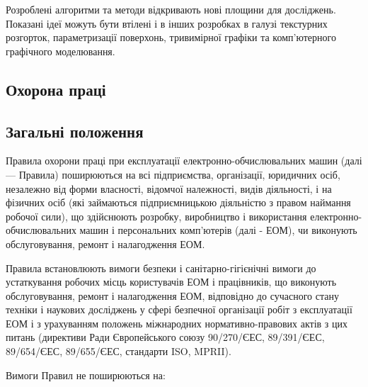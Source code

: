 \documentclass[simple,a4paper,14pt,ukrainian,utf8]{eskdtext}
\begin{document}
    Розроблені алгоритми та методи відкривають нові площини для досліджень. Показані ідеї можуть бути втілені і в інших розробках в галузі текстурних розгорток, параметризації поверхонь, тривимірної графіки та комп’ютерного графічного моделювання.

    \newpage
    \begin{appendices}

                \section{Охорона праці}

            \subsection{Загальні положення}

                Правила охорони праці при експлуатації електронно-обчислювальних машин (далі --- Правила) поширюються на всі підприємства, організації, юридичних осіб, незалежно від форми власності, відомчої належності, видів діяльності, і на фізичних осіб (які займаються підприємницькою діяльністю з правом наймання робочої сили), що здійснюють розробку, виробництво і використання електронно-обчислювальних машин і персональних комп'ютерів (далі - ЕОМ), чи виконують обслуговування, ремонт і налагодження ЕОМ.

                Правила встановлюють вимоги безпеки і санітарно-гігієнічні вимоги до устаткування робочих місць користувачів ЕОМ і працівників, що виконують обслуговування, ремонт і налагодження ЕОМ, відповідно до сучасного стану техніки і наукових досліджень у сфері безпечної організації робіт з експлуатації ЕОМ і з урахуванням положень міжнародних нормативно-правових актів з цих питань (директиви Ради Європейського союзу 90/270/ЄЕС, 89/391/ЄЕС, 89/654/ЄЕС, 89/655/ЄЕС, стандарти ISO, MPRII).

                Вимоги Правил не поширюються на:


\end{appendices}
\end{document}
